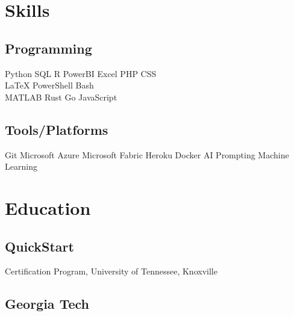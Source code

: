 \documentclass[]{plushcv}
\begin{document}
\begin{paracol}{2}
\switchcolumn[1]



\section{Skills}
\subsection{Programming}
\sectionsep
{}
Python \textbullet{} SQL \textbullet{} R \textbullet{} PowerBI \textbullet{} Excel \textbullet{} PHP \textbullet{} CSS \\
\sectionsep
{}
\LaTeX \textbullet{}  PowerShell \textbullet{}  Bash \\
\sectionsep
{}
MATLAB \textbullet{} Rust \textbullet{} Go \textbullet{} JavaScript \\
\sectionsep
\sectionsep
\subsection{Tools/Platforms}
\sectionsep
Git \textbullet{} Microsoft Azure \textbullet{} Microsoft Fabric \textbullet{} Heroku \textbullet{} Docker \textbullet{} AI Prompting \textbullet{} Machine Learning \\

\sectionsep


\section{Education} 
\subsection{QuickStart}
Certification Program, University of Tennessee, Knoxville \\

\sectionsep
\subsection{Georgia Tech}
\sectionsep


\end{paracol}
\end{document}
